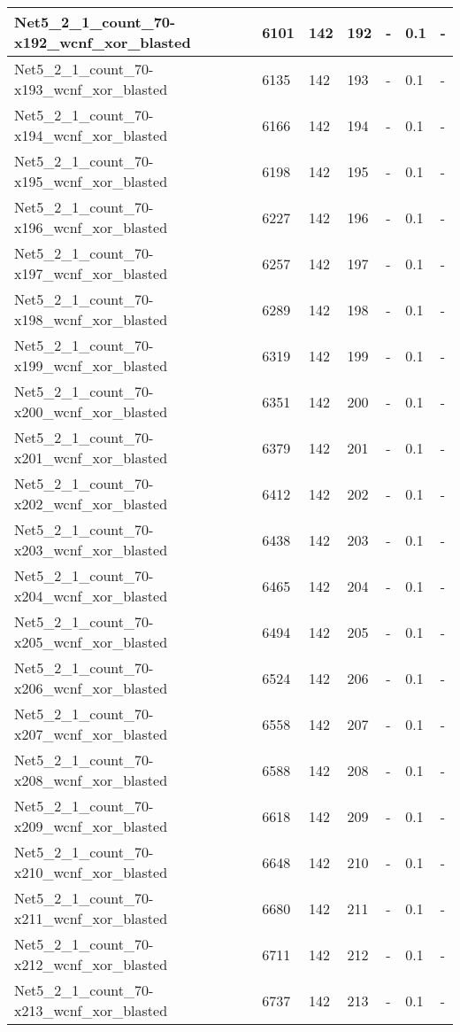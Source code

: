 \begin{scriptsize}
\begin{longtable}{|p{5cm}|l|l|l|l|l|l|}
Net5\_2\_1\_count\_70-x192\_wcnf\_xor\_blasted&6101&142&192&-&0.1&- \\ \hline 
Net5\_2\_1\_count\_70-x193\_wcnf\_xor\_blasted&6135&142&193&-&0.1&- \\ \hline 
Net5\_2\_1\_count\_70-x194\_wcnf\_xor\_blasted&6166&142&194&-&0.1&- \\ \hline 
Net5\_2\_1\_count\_70-x195\_wcnf\_xor\_blasted&6198&142&195&-&0.1&- \\ \hline 
Net5\_2\_1\_count\_70-x196\_wcnf\_xor\_blasted&6227&142&196&-&0.1&- \\ \hline 
Net5\_2\_1\_count\_70-x197\_wcnf\_xor\_blasted&6257&142&197&-&0.1&- \\ \hline 
Net5\_2\_1\_count\_70-x198\_wcnf\_xor\_blasted&6289&142&198&-&0.1&- \\ \hline 
Net5\_2\_1\_count\_70-x199\_wcnf\_xor\_blasted&6319&142&199&-&0.1&- \\ \hline 
Net5\_2\_1\_count\_70-x200\_wcnf\_xor\_blasted&6351&142&200&-&0.1&- \\ \hline 
Net5\_2\_1\_count\_70-x201\_wcnf\_xor\_blasted&6379&142&201&-&0.1&- \\ \hline 
Net5\_2\_1\_count\_70-x202\_wcnf\_xor\_blasted&6412&142&202&-&0.1&- \\ \hline 
Net5\_2\_1\_count\_70-x203\_wcnf\_xor\_blasted&6438&142&203&-&0.1&- \\ \hline 
Net5\_2\_1\_count\_70-x204\_wcnf\_xor\_blasted&6465&142&204&-&0.1&- \\ \hline 
Net5\_2\_1\_count\_70-x205\_wcnf\_xor\_blasted&6494&142&205&-&0.1&- \\ \hline 
Net5\_2\_1\_count\_70-x206\_wcnf\_xor\_blasted&6524&142&206&-&0.1&- \\ \hline 
Net5\_2\_1\_count\_70-x207\_wcnf\_xor\_blasted&6558&142&207&-&0.1&- \\ \hline 
Net5\_2\_1\_count\_70-x208\_wcnf\_xor\_blasted&6588&142&208&-&0.1&- \\ \hline 
Net5\_2\_1\_count\_70-x209\_wcnf\_xor\_blasted&6618&142&209&-&0.1&- \\ \hline 
Net5\_2\_1\_count\_70-x210\_wcnf\_xor\_blasted&6648&142&210&-&0.1&- \\ \hline 
Net5\_2\_1\_count\_70-x211\_wcnf\_xor\_blasted&6680&142&211&-&0.1&- \\ \hline 
Net5\_2\_1\_count\_70-x212\_wcnf\_xor\_blasted&6711&142&212&-&0.1&- \\ \hline 
Net5\_2\_1\_count\_70-x213\_wcnf\_xor\_blasted&6737&142&213&-&0.1&- \\ \hline 

\end{longtable}
\end{scriptsize}
